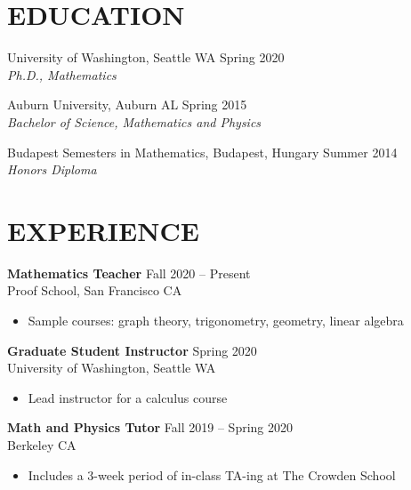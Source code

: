 \documentclass{res}
\begin{document}



\begin{resume}


\section{EDUCATION}
  \vspace{2mm}
  University of Washington, Seattle WA \hfill Spring 2020\\
  \textit{Ph.D., Mathematics}
  
  Auburn University, Auburn AL \hfill Spring 2015 \\
  \textit{Bachelor of Science, Mathematics and Physics}

  Budapest Semesters in Mathematics, Budapest, Hungary \hfill Summer 2014 \\
  \textit{Honors Diploma}

\section{EXPERIENCE}
  \vspace{2mm}

{\bf Mathematics Teacher} \hfill Fall 2020 -- Present \\ Proof School, San Francisco CA

\begin{itemize}
	\item Sample courses: graph theory, trigonometry, geometry, linear algebra
\end{itemize}

{\bf Graduate Student Instructor} \hfill Spring 2020 \\ University of Washington, Seattle WA

\begin{itemize}
\item Lead instructor for a calculus course
\end{itemize}


{\bf Math and Physics Tutor} \hfill Fall 2019 -- Spring 2020 \\ Berkeley CA
\begin{itemize}
\item Includes a 3-week period of in-class TA-ing at The Crowden School
\end{itemize}



\end{resume}
\end{document}
